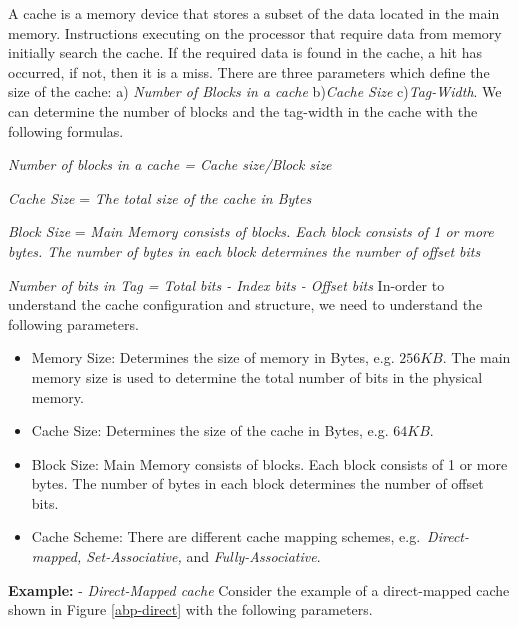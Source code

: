 A cache is a memory device that stores a subset of the data located in the main memory. Instructions executing on the processor that require data from memory initially search the cache. If the required data is found in the cache, a hit has occurred, if not, then it is a miss. There are three parameters which define the size of the cache:
a) \textit{Number of Blocks in a cache} b)\textit{Cache Size} 
 c)\textit{Tag-Width}. We can determine the number of blocks and the tag-width in the cache with the following formulas.



\textit{Number of blocks in a cache = Cache size/Block size} 

\textit{Cache Size} = \textit{The total size of the cache in Bytes}
   
\textit{Block Size} = \textit{Main Memory consists of blocks. Each block consists of 1 or more bytes. The number of bytes in each block determines the number of offset bits} 

\textit{Number of bits in Tag = Total bits - Index bits - Offset bits} 
\newline
In-order to understand the cache configuration and structure, we need to understand the following parameters. 

\begin{itemize}


\item{Memory Size:}
Determines the size of memory in Bytes, e.g. $256 KB$. 
The main memory size is used to determine the total number of bits in the physical memory.


\item{Cache Size:}
Determines the size of the cache in Bytes, e.g. $64 KB$.


\item{Block Size:}
Main Memory consists of blocks. Each block consists of 1 or more bytes. The number of bytes in each block determines the number of offset bits.


\item{Cache Scheme:}
There are different cache mapping schemes, e.g.~\textit{Direct-mapped, Set-Associative,} and \textit{Fully-Associative}.



\end{itemize}

\textbf{Example:} - \textit{Direct-Mapped cache}
Consider the example of a direct-mapped cache shown in Figure \ref{abp-direct} with the following parameters.
 


